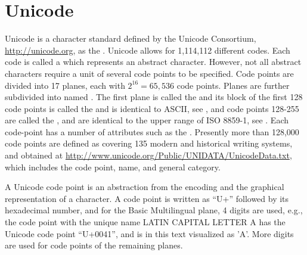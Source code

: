 \section{Unicode}
\label{sec:unicode}
Unicode is a character standard defined by the Unicode Consortium, \url{http://unicode.org}, as the . Unicode allows for 1,114,112 different codes. Each code is called a  which represents an abstract character. However, not all abstract characters require a unit of several code points to be specified. Code points are divided into 17 planes, each with $2^{16}=65,536$ code points. Planes are further subdivided into named . The first plane is called the  and its block of the first 128 code points is called the  and is identical to ASCII, see , and code points 128-255 are called the , and are identical to the upper range of ISO 8859-1, see .  Each code-point has a number of attributes such as the . Presently more than 128,000 code points are defined as covering 135 modern and historical writing systems, and obtained at \url{http://www.unicode.org/Public/UNIDATA/UnicodeData.txt}, which includes the code point, name, and general category.

A Unicode code point is an abstraction from the encoding and the graphical representation of a character. A code point is written as ``U+'' followed by its hexadecimal number, and for the Basic Multilingual plane, 4 digits are used, e.g., the code point with the unique name LATIN CAPITAL LETTER A has the Unicode code point ``U+0041'', and is in this text visualized as 'A'. More digits are used for code points of the remaining planes.

